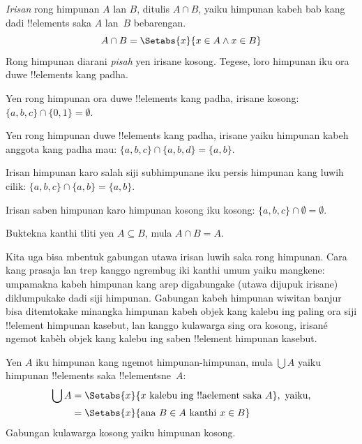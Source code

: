 \documentclass[../../../include/open-logic-section]{subfiles}
\begin{document}
\begin{defn}[Irisan]
\emph{Irisan} rong himpunan $A$ lan $B$, ditulis $A \cap B$,
yaiku himpunan kabeh bab kang dadi !!{element}s saka $A$ lan~$B$
bebarengan.
\[
A \cap B = \Setabs{x}{x \in A \land x \in B}
\]
Rong himpunan diarani \emph{pisah} yen irisane kosong.
Tegese, loro himpunan iku ora duwe !!{element}s kang padha.
\end{defn}

\begin{ex}
Yen rong himpunan ora duwe !!{element}s kang padha, irisane kosong:
$\{ a, b, c\} \cap \{ 0, 1\} = \emptyset$.

Yen rong himpunan duwe !!{element}s kang padha, irisane yaiku
himpunan kabeh anggota kang padha mau:
$\{a, b, c \} \cap \{a, b, d \} = \{a, b\}$.

Irisan himpunan karo salah siji subhimpunane iku persis
himpunan kang luwih cilik:
$\{a, b, c\} \cap \{a, b\} = \{a, b\}$.

Irisan saben himpunan karo himpunan kosong iku kosong:
$\{a, b, c \}\cap \emptyset = \emptyset$.
\end{ex}

\begin{prob}
Buktekna kanthi tliti yen $A \subseteq B$,
mula $A \cap B = A$.
\end{prob}

\begin{explain}
Kita uga bisa mbentuk gabungan utawa irisan luwih saka rong
himpunan. Cara kang prasaja lan trep kanggo ngrembug iki kanthi
umum yaiku mangkene: umpamakna kabeh himpunan kang arep digabungake
(utawa dijupuk irisane) diklumpukake dadi siji himpunan.
Gabungan kabeh himpunan wiwitan banjur bisa ditemtokake minangka
himpunan kabeh objek kang kalebu ing paling ora siji
!!{element} himpunan kasebut, lan kanggo kulawarga sing ora kosong, irisané ngemot kabèh
objek kang kalebu ing saben !!{element} himpunan kasebut.
\end{explain}

\begin{defn}
Yen $A$ iku himpunan kang ngemot himpunan-himpunan,
mula $\bigcup A$ yaiku himpunan !!{element}s saka
!!{element}sne~$A$:
\begin{align*}
\bigcup A & = \Setabs{x}{x \text{ kalebu ing !!a{element} saka } A},
\text{ yaiku,}\\
& = \Setabs{x}{\text{ana } B \in A
  \text{ kanthi } x \in B}
\end{align*}
Gabungan kulawarga kosong yaiku himpunan kosong.
\end{defn}
\end{document}
